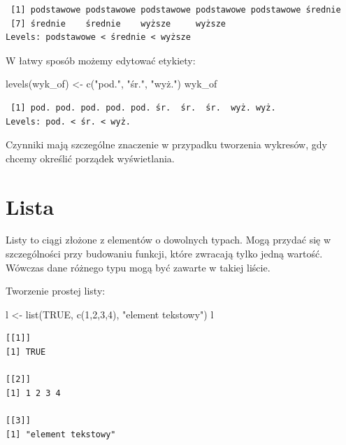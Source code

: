 \documentclass[
  letterpaper,
  DIV=11,
  numbers=noendperiod]{scrreprt}
\newenvironment{Shaded}{\begin{snugshade}}{\end{snugshade}}
\newcommand{\ConstantTok}[1]{\textcolor[rgb]{0.56,0.35,0.01}{#1}}
\newcommand{\DecValTok}[1]{\textcolor[rgb]{0.68,0.00,0.00}{#1}}
\newcommand{\FunctionTok}[1]{\textcolor[rgb]{0.28,0.35,0.67}{#1}}
\newcommand{\NormalTok}[1]{\textcolor[rgb]{0.00,0.23,0.31}{#1}}
\newcommand{\OtherTok}[1]{\textcolor[rgb]{0.00,0.23,0.31}{#1}}
\newcommand{\StringTok}[1]{\textcolor[rgb]{0.13,0.47,0.30}{#1}}
\begin{document}
\begin{verbatim}
 [1] podstawowe podstawowe podstawowe podstawowe podstawowe średnie   
 [7] średnie    średnie    wyższe     wyższe    
Levels: podstawowe < średnie < wyższe
\end{verbatim}

W łatwy sposób możemy edytować etykiety:

\begin{Shaded}
\begin{Highlighting}[]
\FunctionTok{levels}\NormalTok{(wyk\_of) }\OtherTok{\textless{}{-}} \FunctionTok{c}\NormalTok{(}\StringTok{"pod."}\NormalTok{, }\StringTok{"śr."}\NormalTok{, }\StringTok{"wyż."}\NormalTok{)}
\NormalTok{wyk\_of}
\end{Highlighting}
\end{Shaded}

\begin{verbatim}
 [1] pod. pod. pod. pod. pod. śr.  śr.  śr.  wyż. wyż.
Levels: pod. < śr. < wyż.
\end{verbatim}

Czynniki mają szczególne znaczenie w przypadku tworzenia wykresów, gdy
chcemy określić porządek wyświetlania.

\hypertarget{lista}{%
\section{Lista}\label{lista}}

Listy to ciągi złożone z elementów o dowolnych typach. Mogą przydać się
w szczególności przy budowaniu funkcji, które zwracają tylko jedną
wartość. Wówczas dane różnego typu mogą być zawarte w takiej liście.

Tworzenie prostej listy:

\begin{Shaded}
\begin{Highlighting}[]
\NormalTok{l }\OtherTok{\textless{}{-}} \FunctionTok{list}\NormalTok{(}\ConstantTok{TRUE}\NormalTok{, }\FunctionTok{c}\NormalTok{(}\DecValTok{1}\NormalTok{,}\DecValTok{2}\NormalTok{,}\DecValTok{3}\NormalTok{,}\DecValTok{4}\NormalTok{), }\StringTok{"element tekstowy"}\NormalTok{)}
\NormalTok{l}
\end{Highlighting}
\end{Shaded}

\begin{verbatim}
[[1]]
[1] TRUE

[[2]]
[1] 1 2 3 4

[[3]]
[1] "element tekstowy"
\end{verbatim}
\end{document}
